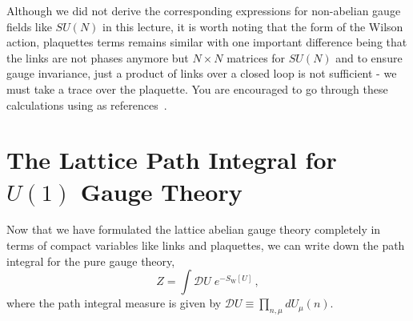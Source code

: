 \documentclass[11pt]{article}
\newcommand{\sideex}[1]{\marginnote{\footnotesize\textcolor{red!50!black}{#1}}}
\theoremstyle{definition}
\begin{document}
Although we did not derive the corresponding expressions for non-abelian gauge fields like $SU(N)$ in this lecture, it is worth noting that the form of the Wilson action\sideex{The next exercise sheet also includes the treatment of non-abelian gauge theories.}, plaquettes terms remains similar with one important difference being that the links are not phases anymore but $N \times N$ matrices for $SU(N)$ and to ensure gauge invariance, just a product of links over a closed loop is not sufficient - we must take a trace over the plaquette. You are encouraged to go through these calculations using as references~\cite{rothe2012lattice,gattringer2010qcd,smit2002lattice}.  

\section{The Lattice Path Integral for \texorpdfstring{$U(1)$}{U(1)} Gauge Theory}
Now that we have formulated the lattice abelian gauge theory completely in terms of compact variables like links and plaquettes, we can write down the path integral for the pure gauge theory,
\begin{equation}\label{eqn:lat_PI}
    Z = \int \mathcal{D}U \; e^{-S_{\mathrm{W}}[U]} \,,
\end{equation}
where the path integral measure is given by $\mathcal{D}U \equiv \displaystyle\prod_{n, \mu} dU_{\mu}(n)$. 
\end{document}
